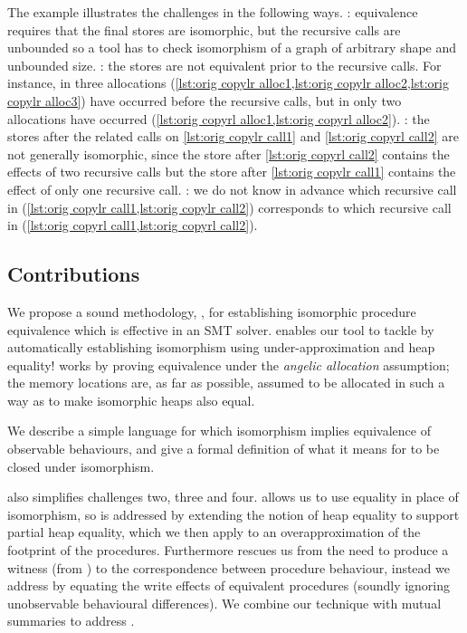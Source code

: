 \documentclass[runningheads,a4paper]{llncs}
\begin{document}
The example illustrates the challenges in the following ways. \textbf{\Cone{}}: equivalence requires that the final stores are isomorphic, but the recursive calls are unbounded so a tool has to check isomorphism of a graph of arbitrary shape and unbounded size. \textbf{\Ctwo{}}: the stores are not equivalent prior to the recursive calls. For instance, in \copylr{} three allocations (\cref{lst:orig copylr alloc1,lst:orig copylr alloc2,lst:orig copylr alloc3}) have occurred before the recursive calls, but in \copyrl{} only two allocations have occurred (\cref{lst:orig copyrl alloc1,lst:orig copyrl alloc2}). \textbf{\Cthree{}}: the stores after the related calls on \cref{lst:orig copylr call1} and \cref{lst:orig copyrl call2} are not generally isomorphic, since the store after \cref{lst:orig copyrl call2} contains the effects of two recursive calls but the store after \cref{lst:orig copylr call1} contains the effect of only one recursive call. \textbf{\Cfour{}}: we do not know in advance which recursive call in \copylr{} (\cref{lst:orig copylr call1,lst:orig copylr call2}) corresponds to which recursive call in \copyrl{} (\cref{lst:orig copyrl call1,lst:orig copyrl call2}).

\subsection{Contributions}

We propose a sound methodology, \metho{}, for establishing isomorphic procedure equivalence which is effective in an SMT solver. \metho{} enables our tool \tool{} to tackle \textbf{\cone{}} by automatically establishing isomorphism using under-approximation and heap equality! \metho{} works by proving equivalence under the \emph{angelic allocation} assumption; the memory locations are, as far as possible, assumed to be allocated in such a way as to make isomorphic heaps also equal.

We describe a simple language \lang{} for which isomorphism implies equivalence of observable behaviours, and give a formal definition of what it means for \lang{} to be closed under isomorphism.

\metho{} also simplifies challenges two, three and four. \metho{} allows us to use equality in place of isomorphism, so \textbf{\ctwo{}} is addressed by extending the notion of heap equality to support partial heap equality, which we then apply to an overapproximation of the footprint of the procedures. Furthermore \metho{} rescues us from the need to produce a witness (from \textbf{\cone{}}) to the correspondence between procedure behaviour, instead we address \textbf{\cthree{}} by equating the write effects of equivalent procedures (soundly ignoring unobservable behavioural differences). We combine our technique with mutual summaries to address \textbf{\cfour{}}.
\end{document}
